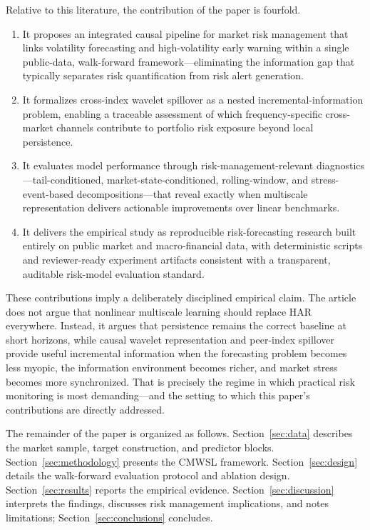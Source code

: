 Relative to this literature, the contribution of the paper is fourfold.
\begin{enumerate}
\item It proposes an integrated causal pipeline for market risk management that links volatility forecasting and high-volatility early warning within a single public-data, walk-forward framework---eliminating the information gap that typically separates risk quantification from risk alert generation.
\item It formalizes cross-index wavelet spillover as a nested incremental-information problem, enabling a traceable assessment of which frequency-specific cross-market channels contribute to portfolio risk exposure beyond local persistence.
\item It evaluates model performance through risk-management-relevant diagnostics---tail-conditioned, market-state-conditioned, rolling-window, and stress-event-based decompositions---that reveal exactly when multiscale representation delivers actionable improvements over linear benchmarks.
\item It delivers the empirical study as reproducible risk-forecasting research built entirely on public market and macro-financial data, with deterministic scripts and reviewer-ready experiment artifacts consistent with a transparent, auditable risk-model evaluation standard.
\end{enumerate}

These contributions imply a deliberately disciplined empirical claim. The article does not argue that nonlinear multiscale learning should replace HAR everywhere. Instead, it argues that persistence remains the correct baseline at short horizons, while causal wavelet representation and peer-index spillover provide useful incremental information when the forecasting problem becomes less myopic, the information environment becomes richer, and market stress becomes more synchronized. That is precisely the regime in which practical risk monitoring is most demanding---and the setting to which this paper's contributions are directly addressed.

The remainder of the paper is organized as follows. Section~\ref{sec:data} describes the market sample, target construction, and predictor blocks. Section~\ref{sec:methodology} presents the CMWSL framework. Section~\ref{sec:design} details the walk-forward evaluation protocol and ablation design. Section~\ref{sec:results} reports the empirical evidence. Section~\ref{sec:discussion} interprets the findings, discusses risk management implications, and notes limitations; Section~\ref{sec:conclusions} concludes.
